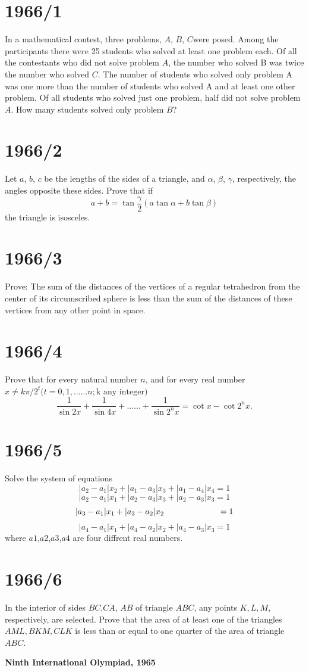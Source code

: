 \documentclass[12pt]{article}
\begin{document}
\section*{1966/1}
In a mathematical contest, three problems, \(A\), \(B\), \(C\)were posed. Among the participants there were 25 students who solved at least one problem each. Of all the contestants who did not solve problem \(A\), the number who solved B was twice the number who solved \(C\). The number of students who solved only problem A was one more than the number of students who solved A and at least one other problem. Of all students who solved just one problem, half did not solve problem \(A\). How many students solved only problem \(B\)?
\section*{1966/2}
Let \(a\), \(b\), \(c\) be the lengths of the sides of a triangle, and \(\alpha\), \(\beta\), \(\gamma\), respectively, the angles opposite these sides. Prove that if
\[
a+b=\tan{\frac{\gamma}{2}(a \tan{\alpha} + b \tan{\beta})}
\]
the triangle is isosceles.
\section*{1966/3}
Prove: The sum of the distances of the vertices of a regular tetrahedron from the center of its circumscribed sphere is less than the sum of the distances of these vertices from any other point in space.
\section*{1966/4}
Prove that for every natural number \( n\), and for every real number \(x \neq k\pi /2^{t}(t=0,1,......n;\text{k any integer)} \)
\[
\frac{1}{\sin 2x}+\frac{1}{\sin 4x}+......+\frac{1}{\sin 2^{n}x}=\cot{x}-\cot{2^{n}x.}
\]
\section*{1966/5}
Solve the system of equations
\[
|a_{2}-a_{1}|x_{2}+  |a_{1}-a_{3}|x_{3}+|a_{1}-a_{4}|x_{4}=1
\]
\[
|a_{2}-a_{1}|x_{1}+  |a_{2}-a_{3}|x_{3}+|a_{2}-a_{3}|x_{3}=1
\]
\[
|a_{3}-a_{1}|x_{1}+  |a_{3}-a_{2}|x_{2} \hspace{2.3 cm} =1
\]
\[
|a_{4}-a_{1}|x_{1}+  |a_{4}-a_{2}|x_{2}+|a_{4}-a_{3}|x_{3}=1
\]
where \(a1\),\(a2\),\(a3\),\(a4\) are four diffrent real numbers.
\section*{1966/6}
In the interior of sides \(BC\),\( CA\), \(AB\) of triangle \(ABC\), any points \(K, L, M,\) respectively, are selected. Prove that the area of at least one of the triangles \(AML, BKM, CLK\) is less than or equal to one quarter of the area of triangle \(ABC\).
\newpage
\begin{center}
{\fontsize{24}{28}\selectfont
\textbf{Ninth International Olympiad, 1965}
}
\end{center}
\end{document}

